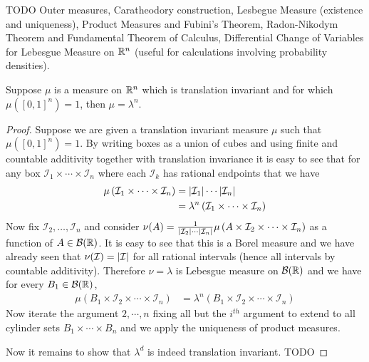 TODO
Outer measures, Caratheodory construction, Lesbegue Measure (existence
and uniqueness), Product Measures and Fubini's Theorem, Radon-Nikodym Theorem and
Fundamental Theorem of Calculus, Differential Change of Variables for
Lebesgue Measure on $\mathbb{R}^n$ (useful for calculations involving
probability densities).

\begin{lem}\label{LesbegueTranslationInvariance} Suppose $\mu$ is a measure on $\mathbb{R}^n$ which is
  translation invariant and for which $\mu([0,1]^n) = 1$, then $\mu =
  \lambda^n$.
\end{lem}
\begin{proof}Suppose we are given a translation invariant measure
  $\mu$ such that $\mu([0,1]^n) = 1$.  By writing boxes as a
  union of cubes and using finite
  and countable additivity together with translation invariance it is
  easy to see that
  for any box $\mathcal{I}_1 \times \cdots \times \mathcal{I}_n$ where
  each $\mathcal{I}_k$ has rational endpoints that we have 
\begin{align*}
\mu\left (\mathcal{I}_1 \times \cdots \times
    \mathcal{I}_n \right ) &= \left \vert \mathcal{I}_1 \right \vert \cdots
  \left \vert \mathcal{I}_n \right \vert \\
 &= \lambda^n \left (\mathcal{I}_1 \times \cdots \times
    \mathcal{I}_n \right )
\end{align*}
Now fix $\mathcal{I}_2, \dots ,\mathcal{I}_n$ and consider $\nu(A) = \frac{1}{ \left \vert \mathcal{I}_2 \right \vert \cdots  \left \vert \mathcal{I}_n \right \vert}\mu \left
  (A \times \mathcal{I}_2 \times \cdots \times
    \mathcal{I}_n \right ) $ as a function of $A \in
  \mathcal{B}(\mathbb{R})$.  It is easy to see that this is a Borel
  measure and we have already seen that $\nu(\mathcal{I}) =
  \left \vert \mathcal{I} \right \vert$ for all rational intervals (hence all intervals
    by countable additivity).  Therefore $\nu = \lambda$ is Lebesgue
    measure on $\mathcal{B}(\mathbb{R})$ and we have for every $B_1 \in
    \mathcal{B}(\mathbb{R})$,
\begin{align*}
\mu\left (B_1 \times \mathcal{I}_2 \times\cdots \times
    \mathcal{I}_n \right ) 
 &= \lambda^n \left (B_1 \times \mathcal{I}_2 \times \cdots \times
    \mathcal{I}_n \right )
\end{align*}
Now iterate the argument $2, \cdots, n$ fixing all but the $i^{th}$
argument to extend to all cylinder sets $B_1 \times \cdots \times B_n$
and we apply the uniqueness of product measures.

Now it remains to show that $\lambda^d$ is indeed translation
invariant.
TODO
\end{proof}
